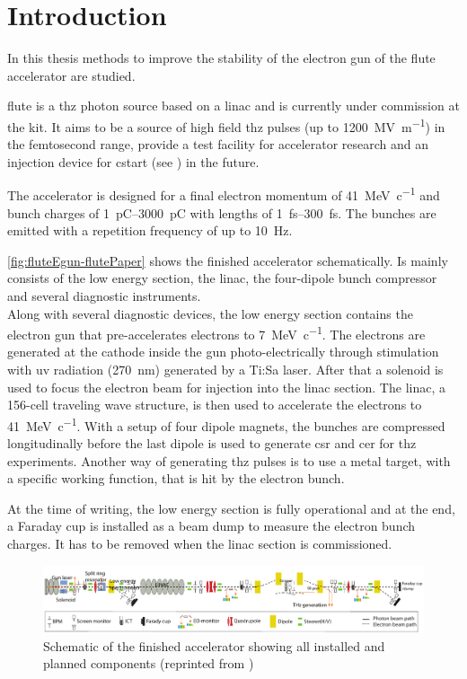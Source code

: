\chapter{Introduction}
In this thesis methods to improve the stability of the electron gun of the \gls{flute} accelerator are studied.

\Gls{flute} is a \gls{thz} photon source based on a \gls{linac} and is currently under commission at the \gls{kit}. It aims to be a source of high field \gls{thz} pulses (up to \SI{1200}{\mega\volt\per\meter}) in the femtosecond range, provide a test facility for accelerator research and an injection device for \gls{cstart} (see \cite{SchaeferHaererPapash2019_1000091183}) in the future. \cite{Naknaimueang:2011zz}

The accelerator is designed for a final electron momentum of \SI{41}{\MeV\per c} and bunch charges of \SIrange{1}{3000}{\pico\coulomb} with lengths of \SIrange{1}{300}{\fs}. The bunches are emitted with a repetition frequency of up to \SI{10}{\hertz}. \cite{Malygin2018}

\autoref{fig:fluteEgun-flutePaper} shows the finished accelerator schematically. Is mainly consists of the low energy section, the \gls{linac}, the four-dipole bunch compressor and several diagnostic instruments.\\
Along with several diagnostic devices, the low energy section contains the electron gun that pre-accelerates electrons to \SI{7}{\MeV\per c}. The electrons are generated at the cathode inside the gun photo-electrically through stimulation with \gls{uv} radiation (\SI{270}{\nm}) generated by a Ti:Sa laser. After that a solenoid is used to focus the electron beam for injection into the \gls{linac} section. The \gls{linac}, a 156-cell traveling wave structure, is then used to accelerate the electrons to \SI{41}{\MeV\per c}. With a setup of four dipole magnets, the bunches are compressed longitudinally before the last dipole is used to generate \gls{csr} and \gls{cer} for \gls{thz} experiments. Another way of generating \gls{thz} pulses is to use a metal target, with a specific working function, that is hit by the electron bunch. \cite{Nasse:IPAC13-WEPWA010}

At the time of writing, the low energy section is fully operational and at the end, a Faraday cup is installed as a beam dump to measure the electron bunch charges. It has to be removed when the \gls{linac} section is commissioned.

\begin{figure}[tb]
	\centering
	\includegraphics[width=\textwidth]{chap/StabilityOfTheElectronGun/img/flutePaper.png}
	\caption[FLUTE schematic with all components]{Schematic of the finished accelerator showing all installed and planned components (reprinted from \cite{Yan2018})}
	\label{fig:fluteEgun-flutePaper}
\end{figure}

